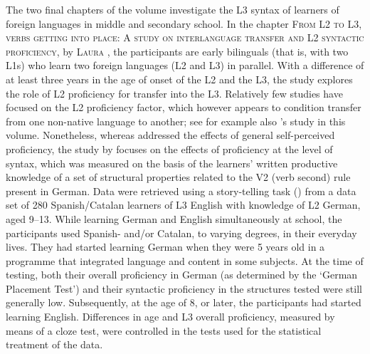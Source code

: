 \documentclass[output=paper,colorlinks,citecolor=brown,nonflat]{langsci/langscibook}
\begin{document}
The two final chapters of the volume investigate the L3 syntax of learners of foreign languages in middle and secondary school. In the chapter \textsc{From L2 to L3, verbs getting into place: A study on interlanguage transfer and L2 syntactic proficiency}, by \textsc{Laura \citeauthor{chapters/sanchez7}}, the participants are early bilinguals (that is, with two L1s) who learn two foreign languages (L2 and L3) in parallel. With a difference of at least three years in the age of onset of the L2 and the L3, the study explores the role of L2 proficiency for transfer into the L3. Relatively few studies have focused on the L2 proficiency factor, which however appears to condition transfer from one non-native language to another; see for example also \citeauthor{chapters/sciutti}’s study in this volume. Nonetheless, whereas \citeauthor{chapters/sciutti} addressed the effects of general self-perceived proficiency, the study by \citeauthor{chapters/sanchez7} focuses on the effects of proficiency at the level of syntax, which was measured on the basis of the learners’ written productive knowledge of a set of structural properties related to the V2 (verb second) rule present in German. Data were retrieved using a story-telling task (\citealt{SánchezJarvis2008}) from a data set of 280 Spanish/Catalan learners of L3 English with knowledge of L2 German, aged 9--13. While learning German and English simultaneously at school, the participants used Spanish- and/or Catalan, to varying degrees, in their everyday lives. They had started learning German when they were 5 years old in a programme that integrated language and content in some subjects. At the time of testing, both their overall proficiency in German (as determined by the ‘German Placement Test’) and their syntactic proficiency in the structures tested were still generally low. Subsequently, at the age of 8, or later, the participants had started learning English. Differences in age and L3 overall proficiency, measured by means of a cloze test, were controlled in the tests used for the statistical treatment of the data.
\end{document}

